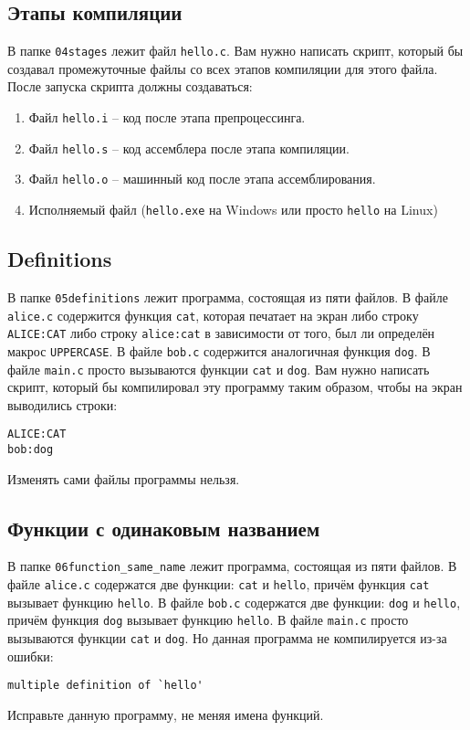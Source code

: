 \documentclass{article}
\begin{document}
\subsection{Этапы компиляции}
В папке \texttt{04stages} лежит файл \texttt{hello.c}. Вам нужно написать скрипт, который бы создавал промежуточные файлы со всех этапов компиляции для этого файла. После запуска скрипта должны создаваться:
\begin{enumerate}
\item Файл \texttt{hello.i} -- код после этапа препроцессинга.
\item Файл \texttt{hello.s} -- код ассемблера после этапа компиляции.
\item Файл \texttt{hello.o} -- машинный код после этапа ассемблирования.
\item Исполняемый файл (\texttt{hello.exe} на Windows или просто \texttt{hello} на Linux)
\end{enumerate}


\subsection{Definitions}
В папке \texttt{05definitions} лежит программа, состоящая из пяти файлов. В файле \texttt{alice.c} содержится функция \texttt{cat}, которая печатает на экран либо строку \texttt{ALICE:CAT} либо строку \texttt{alice:cat} в зависимости от того, был ли определён макрос \texttt{UPPERCASE}. В файле \texttt{bob.c} содержится аналогичная функция \texttt{dog}. В файле \texttt{main.c} просто вызываются функции \texttt{cat} и \texttt{dog}. Вам нужно написать скрипт, который бы компилировал эту программу таким образом, чтобы на экран выводились строки:
\begin{lstlisting}[style=csMiptBash]
ALICE:CAT
bob:dog
\end{lstlisting}
Изменять сами файлы программы нельзя.


\subsection{Функции с одинаковым названием}
В папке \texttt{06function\_same\_name} лежит программа, состоящая из пяти файлов. В файле \texttt{alice.c} содержатся две функции: \texttt{cat} и \texttt{hello}, причём функция \texttt{cat} вызывает функцию \texttt{hello}. В файле \texttt{bob.c} содержатся две функции: \texttt{dog} и \texttt{hello}, причём функция \texttt{dog} вызывает функцию \texttt{hello}. В файле \texttt{main.c} просто вызываются функции \texttt{cat} и \texttt{dog}.
Но данная программа не компилируется из-за ошибки:
\begin{lstlisting}[style=csMiptBash]
multiple definition of `hello'
\end{lstlisting}
Исправьте данную программу, не меняя имена функций.
\end{document}
